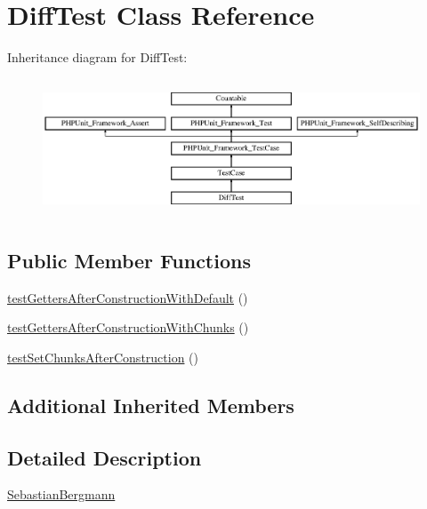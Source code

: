 \hypertarget{class_sebastian_bergmann_1_1_diff_1_1_diff_test}{}\section{Diff\+Test Class Reference}
\label{class_sebastian_bergmann_1_1_diff_1_1_diff_test}
Inheritance diagram for Diff\+Test\+:\begin{figure}[H]
\begin{center}
\leavevmode
\includegraphics[height=4.129793cm]{class_sebastian_bergmann_1_1_diff_1_1_diff_test}
\end{center}
\end{figure}
\subsection*{Public Member Functions}
\begin{DoxyCompactItemize}
\item 
\mbox{\hyperlink{class_sebastian_bergmann_1_1_diff_1_1_diff_test_ac8e40efe001f6cb16c98f63370335f8a}{test\+Getters\+After\+Construction\+With\+Default}} ()
\item 
\mbox{\hyperlink{class_sebastian_bergmann_1_1_diff_1_1_diff_test_a442870dd4e703cee92257e107dcf3de7}{test\+Getters\+After\+Construction\+With\+Chunks}} ()
\item 
\mbox{\hyperlink{class_sebastian_bergmann_1_1_diff_1_1_diff_test_a699719ec1895abbf4536ca94cc0c250c}{test\+Set\+Chunks\+After\+Construction}} ()
\end{DoxyCompactItemize}
\subsection*{Additional Inherited Members}


\subsection{Detailed Description}
\mbox{\hyperlink{namespace_sebastian_bergmann}{Sebastian\+Bergmann}}

